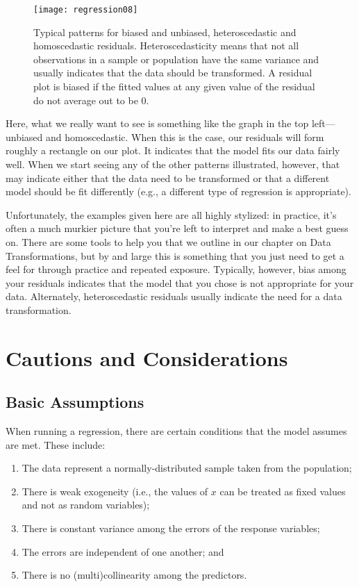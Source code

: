 \begin{figure}[htp]
\texttt{[image: regression08]}
\caption{Typical patterns for biased and unbiased, heteroscedastic and homoscedastic residuals. Heteroscedasticity means that not all observations in a sample or population have the same variance and usually indicates that the data should be transformed. A residual plot is biased if the fitted values at any given value of the residual do not average out to be 0.}
\label{fig:regression08}
\end{figure}

Here, what we really want to see is something like the graph in the top left---unbiased  and homoscedastic. When this is the case, our residuals will form roughly a rectangle on our plot. It indicates that the model fits our data fairly well. When we start seeing any of the other patterns illustrated, however, that may indicate either that the data need to be transformed or that a different model should be fit differently (e.g., a different type of regression is appropriate).

Unfortunately, the examples given here are all highly stylized: in practice, it's often a much murkier picture that you're left to interpret and make a best guess on. There are some tools to help you that we outline in our chapter on Data Transformations, but by and large this is something that you just need to get a feel for through practice and repeated exposure. Typically, however, bias among your residuals indicates that the model that you chose is not appropriate for your data. Alternately, heteroscedastic  residuals usually indicate the need for a data transformation.

\section{Cautions and Considerations}

\subsection{Basic Assumptions}

When running a regression, there are certain conditions that the model assumes are met. These include:
\begin{enumerate}
	\item The data represent a normally-distributed sample taken from the population;
	\item There is weak exogeneity (i.e., the values of $x$ can be treated as fixed values and not as random variables);
	\item There is constant variance among the errors of the response variables;
	\item The errors are independent of one another; and
	\item There is no (multi)collinearity among the predictors.
\end{enumerate}

